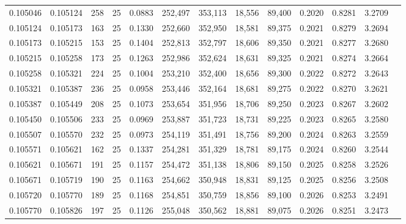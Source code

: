 \begin{tabular}{rrrrrrrrrrrrr}
0.105046 & 0.105124 &   258 &  25 &                                     0.0883 & 252,497 & 353,113 &  18,556 &  89,400 & 0.2020 & 0.8281 & 3.2709 \\
0.105124 & 0.105173 &   163 &  25 &                                     0.1330 & 252,660 & 352,950 &  18,581 &  89,375 & 0.2021 & 0.8279 & 3.2694 \\
0.105173 & 0.105215 &   153 &  25 &                                     0.1404 & 252,813 & 352,797 &  18,606 &  89,350 & 0.2021 & 0.8277 & 3.2680 \\
0.105215 & 0.105258 &   173 &  25 &                                     0.1263 & 252,986 & 352,624 &  18,631 &  89,325 & 0.2021 & 0.8274 & 3.2664 \\
0.105258 & 0.105321 &   224 &  25 &                                     0.1004 & 253,210 & 352,400 &  18,656 &  89,300 & 0.2022 & 0.8272 & 3.2643 \\
0.105321 & 0.105387 &   236 &  25 &                                     0.0958 & 253,446 & 352,164 &  18,681 &  89,275 & 0.2022 & 0.8270 & 3.2621 \\
0.105387 & 0.105449 &   208 &  25 &                                     0.1073 & 253,654 & 351,956 &  18,706 &  89,250 & 0.2023 & 0.8267 & 3.2602 \\
0.105450 & 0.105506 &   233 &  25 &                                     0.0969 & 253,887 & 351,723 &  18,731 &  89,225 & 0.2023 & 0.8265 & 3.2580 \\
0.105507 & 0.105570 &   232 &  25 &                                     0.0973 & 254,119 & 351,491 &  18,756 &  89,200 & 0.2024 & 0.8263 & 3.2559 \\
0.105571 & 0.105621 &   162 &  25 &                                     0.1337 & 254,281 & 351,329 &  18,781 &  89,175 & 0.2024 & 0.8260 & 3.2544 \\
0.105621 & 0.105671 &   191 &  25 &                                     0.1157 & 254,472 & 351,138 &  18,806 &  89,150 & 0.2025 & 0.8258 & 3.2526 \\
0.105671 & 0.105719 &   190 &  25 &                                     0.1163 & 254,662 & 350,948 &  18,831 &  89,125 & 0.2025 & 0.8256 & 3.2508 \\
0.105720 & 0.105770 &   189 &  25 &                                     0.1168 & 254,851 & 350,759 &  18,856 &  89,100 & 0.2026 & 0.8253 & 3.2491 \\
0.105770 & 0.105826 &   197 &  25 &                                     0.1126 & 255,048 & 350,562 &  18,881 &  89,075 & 0.2026 & 0.8251 & 3.2473 \\

\end{tabular}
